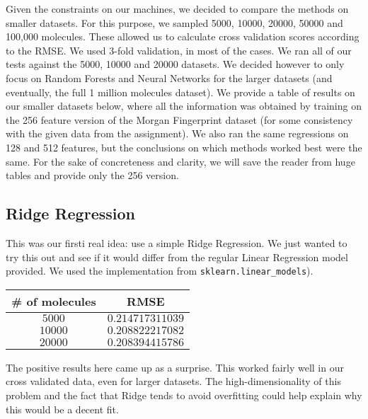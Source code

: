 \documentclass[10pt]{article}
\begin{document}
Given the constraints on our machines, we decided to compare the methods
on smaller datasets. For this purpose, we sampled 5000, 10000, 20000, 50000 and
100,000 molecules. These allowed us to calculate cross validation scores 
according to the RMSE. We used 3-fold validation, in most of the cases. We ran
all of our tests against the 5000, 10000 and 20000 datasets. We decided
however to only focus on Random Forests and Neural Networks for the larger
datasets (and eventually, the full 1 million molecules dataset). We provide
a table of results on our smaller datasets below, where all the information
was obtained by training on the 256 feature version of the Morgan Fingerprint dataset
(for some consistency with the given data from the assignment). We also ran the
same regressions on 128 and 512 features, but the conclusions on which methods
worked best were the same. For the sake of concreteness and clarity, we will
save the reader from huge tables and provide only the 256 version.

\subsection{Ridge Regression}

This was our firsti real idea: use a simple Ridge Regression. We just wanted to try
this out and see if it would differ from the regular Linear Regression model
provided. We used the implementation from \verb|sklearn.linear_models|).

\medskip

\begin{center}

\begin{tabular}[center]{|c|c|}
\hline
\# of molecules & RMSE \\
\hline
$5000$ & $0.214717311039$ \\
\hline 
$10000$ & $0.208822217082$ \\
\hline
$20000$ & $0.208394415786$ \\
\hline
\end{tabular}

\end{center}

\medskip

The positive results here came up as a surprise. This worked fairly well in our
cross validated data, even for larger datasets. The high-dimensionality of this
problem and the fact that Ridge tends to avoid overfitting could help explain
why this would be a decent fit. 
\end{document}
